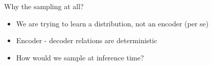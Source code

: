 \documentclass[10pt,aspectratio=169,handout]{beamer}
\begin{document}
\begin{frame}{Why the sampling at all?}
    \begin{itemize}[<+->]
        \item We are trying to learn a distribution, not an encoder (per se)
        \item Encoder - decoder relations are deterministic
        \item How would we sample at inference time?
    \end{itemize}
    \begin{center}
    \end{center}
\end{frame}
\end{document}
